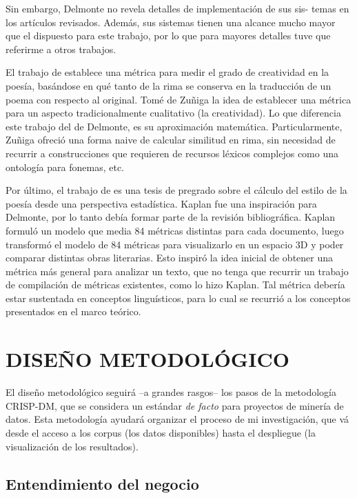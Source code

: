 \documentclass[12pt,letterpaper,twoside]{article}
\begin{document}
Sin embargo, Delmonte no revela detalles de implementación de sus sis-
temas en los artículos revisados. Además, sus sistemas tienen una
alcance mucho mayor que el dispuesto para este trabajo, por lo que para
mayores detalles tuve que referirme a otros trabajos.

El trabajo de \cite{zuniga2017automatic} establece una métrica para
medir el grado de creatividad en la poesía, basándose en qué tanto de
la rima se conserva en la traducción de un poema con respecto al
original. Tomé de Zuñiga la idea de establecer una métrica para un
aspecto tradicionalmente cualitativo (la creatividad). Lo que
diferencia este trabajo del de Delmonte, es su aproximación
matemática. Particularmente, Zuñiga ofreció una forma naive de
calcular similitud en rima, sin necesidad de recurrir a construcciones
que requieren de recursos léxicos complejos como una ontología para
fonemas, etc.

Por último, el trabajo de \cite{kaplan2006computational} es una tesis
de pregrado sobre el cálculo del estilo de la poesía desde una
perspectiva estadística. Kaplan fue una inspiración para Delmonte, por
lo tanto debía formar parte de la revisión bibliográfica. Kaplan
formuló un modelo que media 84 métricas distintas para cada documento,
luego transformó el modelo de 84 métricas para visualizarlo en un
espacio 3D y poder comparar distintas obras literarias. Esto inspiró
la idea inicial de obtener una métrica más general para analizar un
texto, que no tenga que recurrir un trabajo de compilación de métricas
existentes, como lo hizo Kaplan. Tal métrica debería estar sustentada
en conceptos linguísticos, para lo cual se recurrió a  los conceptos
presentados en el marco teórico.

\section{DISEÑO METODOLÓGICO}
\label{sec:orga07fe72}
El diseño metodológico seguirá --a grandes rasgos-- los pasos de la
metodología CRISP-DM, que se considera un estándar \emph{de facto} para
proyectos de minería de datos. Esta metodología ayudará organizar
el proceso de mi investigación, que vá desde el acceso a los corpus
(los datos disponibles) hasta el despliegue (la visualización de
los resultados).

\subsection{Entendimiento del negocio}
\label{sec:org58baeb5}
\end{document}
